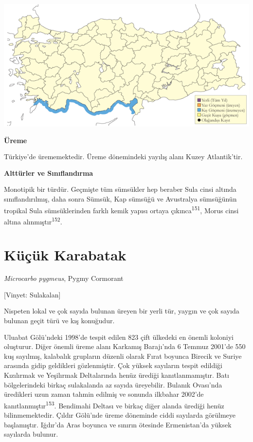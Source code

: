 \documentclass[
  letterpaper,
  DIV=11,
  numbers=noendperiod]{scrreprt}
\begin{document}
\includegraphics{images/harita_Page_076.png}

\textbf{Üreme}

Türkiye'de ürememektedir. Üreme dönemindeki yayılış alanı Kuzey
Atlantik'tir.

\textbf{Alttürler ve Sınıflandırma}

Monotipik bir türdür. Geçmişte tüm sümsükler hep beraber Sula cinsi
altında sınıflandırılmış, daha sonra Sümsük, Kap sümsüğü ve Avustralya
sümsüğünün tropikal Sula sümsüklerinden farklı kemik yapısı ortaya
çıkınca\textsuperscript{151}, Morus cinsi altına
alınmıştır\textsuperscript{152}.

\section{Küçük Karabatak}\label{kuxfcuxe7uxfck-karabatak}

\emph{Microcarbo pygmeus}, Pygmy Cormorant

{[}Vinyet: Sulakalan{]}

Nispeten lokal ve çok sayıda bulunan üreyen bir yerli tür, yaygın ve çok
sayıda bulunan geçit türü ve kış konuğudur.

Uluabat Gölü'ndeki 1998'de tespit edilen 823 çift ülkedeki en önemli
koloniyi oluşturur. Diğer önemli üreme alanı Karkamış Barajı'nda 6
Temmuz 2001'de 550 kuş sayılmış, kalabalık grupların düzenli olarak
Fırat boyunca Birecik ve Suriye arasında gidip geldikleri gözlenmiştir.
Çok yüksek sayıların tespit edildiği Kızılırmak ve Yeşilırmak
Deltalarında henüz ürediği kanıtlanmamıştır. Batı bölgelerindeki birkaç
sulakalanda az sayıda üreyebilir. Bulanık Ovası'nda üredikleri uzun
zaman tahmin edilmiş ve sonunda ilkbahar 2002'de
kanıtlanmıştır\textsuperscript{153}. Bendimahi Deltası ve birkaç diğer
alanda ürediği henüz bilinmemektedir. Çıldır Gölü'nde üreme döneminde
ciddi sayılarda görülmeye başlamıştır. Iğdır'da Aras boyunca ve sınırın
ötesinde Ermenistan'da yüksek sayılarda bulunur.
\end{document}
